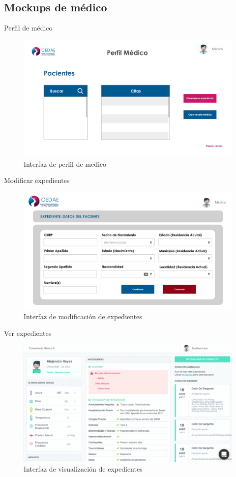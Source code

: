 \documentclass[12pt,letterpaper]{article}
\begin{document}
        \subsection{Mockups de médico}
        Perfil de médico
            \begin{figure}[H]
                \centering
                \includegraphics [scale=0.2]{med_perfil}
                \caption{Interfaz de perfil de medico}
            \end{figure}
        Modificar expedientes
            \begin{figure}[H]
                \centering
                \includegraphics [scale=0.2]{med_mod_expediente}
                \caption{Interfaz de modificación de expedientes}
            \end{figure}
        Ver expedientes
            \begin{figure}[H]
                \centering
                \includegraphics [scale=0.2]{med_ver_expediente}
                \caption{Interfaz de visualización de expedientes}
            \end{figure}
\end{document}
